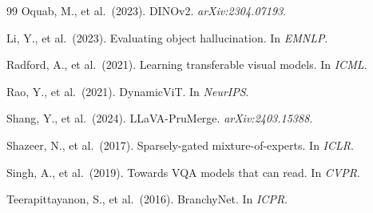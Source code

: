 \documentclass[11pt,a4paper]{article}
\begin{document}
\begin{thebibliography}{99}
Oquab, M., et al.\ (2023). DINOv2. \emph{arXiv:2304.07193}.

Li, Y., et al.\ (2023). Evaluating object hallucination. In \emph{EMNLP}.

Radford, A., et al.\ (2021).
Learning transferable visual models. In \emph{ICML}.

Rao, Y., et al.\ (2021). DynamicViT. In \emph{NeurIPS}.

Shang, Y., et al.\ (2024). LLaVA-PruMerge. \emph{arXiv:2403.15388}.

Shazeer, N., et al.\ (2017). Sparsely-gated mixture-of-experts. In \emph{ICLR}.

Singh, A., et al.\ (2019). Towards VQA models that can read. In \emph{CVPR}.

Teerapittayanon, S., et al.\ (2016). BranchyNet. In \emph{ICPR}.

\end{thebibliography}
\end{document}
